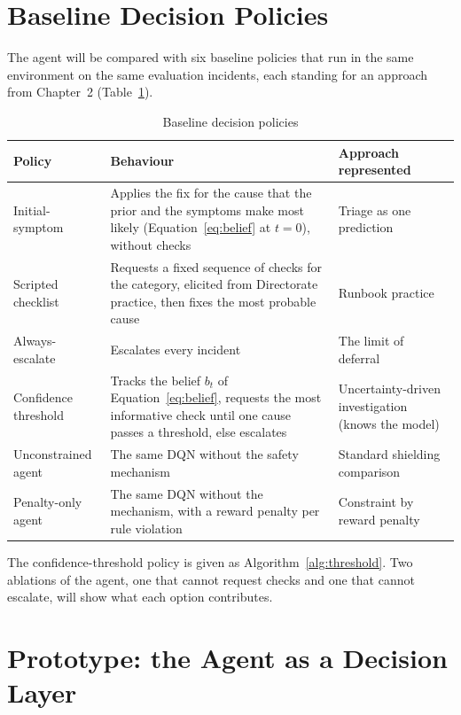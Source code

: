 \section{Baseline Decision Policies}
\label{sec:baselines}

The agent will be compared with six baseline policies that run in the same environment on the same evaluation incidents, each standing for an approach from Chapter~2 (Table~\ref{tab:baselines}).

\begin{table}[H]
\centering
\caption{Baseline decision policies}
\label{tab:baselines}
\small
\begin{tabular}{|p{3.4cm}|p{7.4cm}|p{4.2cm}|}
\hline
\textbf{Policy} & \textbf{Behaviour} & \textbf{Approach represented} \\ \hline
Initial-symptom & Applies the fix for the cause that the prior and the symptoms make most likely (Equation~\eqref{eq:belief} at $t = 0$), without checks & Triage as one prediction \\ \hline
Scripted checklist & Requests a fixed sequence of checks for the category, elicited from Directorate practice, then fixes the most probable cause & Runbook practice \\ \hline
Always-escalate & Escalates every incident & The limit of deferral \\ \hline
Confidence threshold & Tracks the belief $b_t$ of Equation~\eqref{eq:belief}, requests the most informative check until one cause passes a threshold, else escalates & Uncertainty-driven investigation (knows the model) \\ \hline
Unconstrained agent & The same DQN without the safety mechanism & Standard shielding comparison \\ \hline
Penalty-only agent & The same DQN without the mechanism, with a reward penalty per rule violation & Constraint by reward penalty \\ \hline
\end{tabular}
\end{table}

The confidence-threshold policy is given as Algorithm~\ref{alg:threshold}. Two ablations of the agent, one that cannot request checks and one that cannot escalate, will show what each option contributes.

\section{Prototype: the Agent as a Decision Layer}
\label{sec:prototype}

